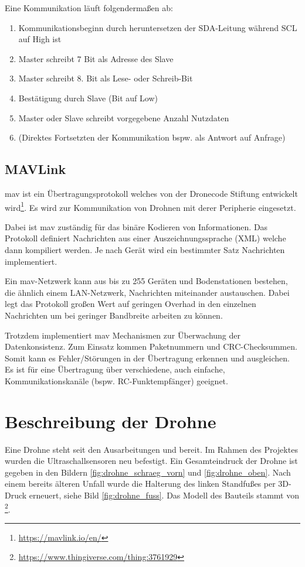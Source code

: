 Eine Kommunikation läuft folgendermaßen ab:
\begin{enumerate}
    \item Kommunikationsbeginn durch heruntersetzen der SDA-Leitung während SCL auf High ist
    \item Master schreibt 7 Bit als Adresse des Slave
    \item Master schreibt 8. Bit als Lese- oder Schreib-Bit
    \item Bestätigung durch Slave (Bit auf Low)
    \item Master oder Slave schreibt vorgegebene Anzahl Nutzdaten
    \item (Direktes Fortsetzten der Kommunikation bspw. als Antwort auf Anfrage) 
\end{enumerate}

\subsection{MAVLink}
\gls{mav} ist ein Übertragungsprotokoll welches von der Dronecode Stiftung entwickelt wird\footnote{\url{https://mavlink.io/en/}}. Es wird zur Kommunikation von Drohnen mit derer Peripherie eingesetzt.

Dabei ist \gls{mav} zuständig für das binäre Kodieren von Informationen. Das Protokoll definiert Nachrichten aus einer Auszeichnungssprache (XML) welche dann kompiliert werden. Je nach Gerät wird ein bestimmter Satz Nachrichten implementiert.

Ein \gls{mav}-Netzwerk kann aus bis zu 255 Geräten und Bodenstationen bestehen, die ähnlich einem LAN-Netzwerk, Nachrichten miteinander austauschen. Dabei legt das Protokoll großen Wert auf geringen Overhad in den einzelnen Nachrichten um bei geringer Bandbreite arbeiten zu können.

Trotzdem implementiert \gls{mav} Mechanismen zur Überwachung der Datenkonsistenz. Zum Einsatz kommen Paketnummern und CRC-Checksummen. Somit kann es Fehler/Störungen in der Übertragung erkennen und ausgleichen. Es ist für eine Übertragung über verschiedene, auch einfache, Kommunikationskanäle (bspw. RC-Funktempfänger) geeignet.

\section{Beschreibung der Drohne}
Eine Drohne steht seit den Ausarbeitungen \cite{wirthErweiterungBestehendenDrohne2022} und \cite{wirthErweiterungBestehendenDrohne2022a} bereit. Im Rahmen des Projektes \cite{markusreinErweiterungBestehenderDrohnen2023} wurden die Ultraschallsensoren neu befestigt. Ein Gesamteindruck der Drohne ist gegeben in den Bildern \ref{fig:drohne_schraeg_vorn} und \ref{fig:drohne_oben}. Nach einem bereits älteren Unfall wurde die Halterung des linken Standfußes per 3D-Druck erneuert, siehe Bild \ref{fig:drohne_fuss}. Das Modell des Bauteils stammt von \footnote{\url{https://www.thingiverse.com/thing:3761929}}. 

